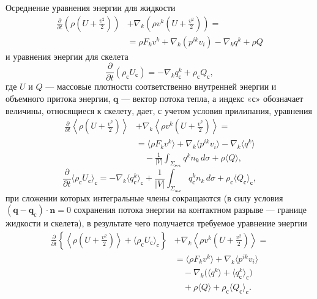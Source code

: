 Осреднение уравнения энергии для жидкости
\[
\begin{aligned}
\frac{\partial}{\partial t}\left(\rho\left(U+\frac{v^2}{2}\right)\right)
&+\nabla_k\left(\rho v^k\left(U+\frac{v^2}{2}\right)\right)=\\
&=\rho F_kv^k+\nabla_k(p^{ik}v_i)-\nabla_kq^k+\rho Q
\end{aligned}
\]
и уравнения энергии для скелета
\[
\frac{\partial}{\partial t}(\rho_{\text{с}}U_{\text{с}})=-\nabla_kq_{\text{с}}^k+\rho_{\text{с}}Q_{\text{с}},
\]
где $U$ и $Q$ --- массовые плотности соответственно внутренней энергии и объемного притока энергии, $\boldsymbol{q}$ --- вектор потока тепла, а индекс «с» обозначает величины, относящиеся к скелету, дает, с учетом условия прилипания, уравнения
\[
\begin{aligned}
\frac{\partial}{\partial t}\left\langle\rho\left(U+\frac{v^2}{2}\right)\right\rangle
&+\nabla_k\left\langle\rho v^k\left(U+\frac{v^2}{2}\right)\right\rangle=\\
&=\langle\rho F_kv^k\rangle+\nabla_k\langle p^{ik}v_i\rangle-\nabla_k\langle q^k\rangle\\
&\quad-\frac{1}{|V|}\int_{\Sigma_{\text{ж-с}}}q^kn_k\,d\sigma+\rho\langle Q\rangle,
\end{aligned}
\]
\[
\frac{\partial}{\partial t}\langle\rho_{\text{с}}U_{\text{с}}\rangle_{\text{с}}
=-\nabla_k\langle q_{\text{с}}^k\rangle_{\text{с}}+\frac{1}{|V|}\int_{\Sigma_{\text{ж-с}}}q_{\text{с}}^kn_k\,d\sigma+\rho_{\text{с}}\langle Q_{\text{с}}\rangle_{\text{с}},
\]
при сложении которых интегральные члены сокращаются (в силу условия $(\boldsymbol{q}-\boldsymbol{q}_{\text{с}})\cdot\boldsymbol{n}=0$ сохранения потока энергии на контактном разрыве --- границе жидкости и скелета), в результате чего получается требуемое уравнение энергии
\begin{equation}
\begin{aligned}
\frac{\partial}{\partial t}\left\{\left\langle\rho\left(U+\frac{v^2}{2}\right)\right\rangle+\langle\rho_{\text{с}}U_{\text{с}}\rangle_{\text{с}}\right\}
&+\nabla_k\left\langle\rho v^k\left(U+\frac{v^2}{2}\right)\right\rangle=\\
&=\langle\rho F_kv^k\rangle+\nabla_k\langle p^{ik}v_i\rangle\\
&\quad-\nabla_k\bigl(\langle q^k\rangle+\langle q_{\text{с}}^k\rangle_{\text{с}}\bigr)\\
&\quad+\rho\langle Q\rangle+\rho_{\text{с}}\langle Q_{\text{с}}\rangle_{\text{с}}.
\end{aligned}
\tag{5.6}\label{q3:eq-5-6}
\end{equation}

